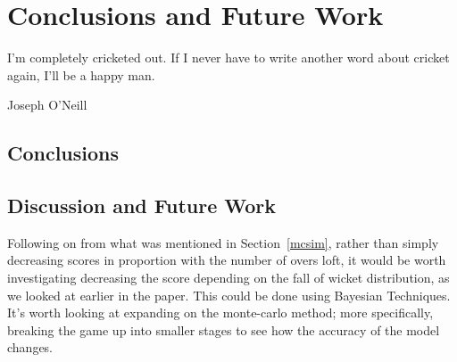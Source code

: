 \chapter{Conclusions and Future Work}

\epigraph{I'm completely cricketed out. If I never have to write another word about cricket again, I'll be a happy man.}{Joseph O'Neill}

\section{Conclusions}




\section{Discussion and Future Work}
Following on from what was mentioned in Section~\ref{mcsim}, rather than simply decreasing scores in proportion with the number of overs loft, 
it would be worth investigating decreasing the score depending on the fall of wicket distribution, as we looked at earlier in the paper. This could be 
done using Bayesian Techniques. \\

It's worth looking at expanding on the monte-carlo method; more specifically, breaking the game up into smaller stages to see how the accuracy of the model changes.